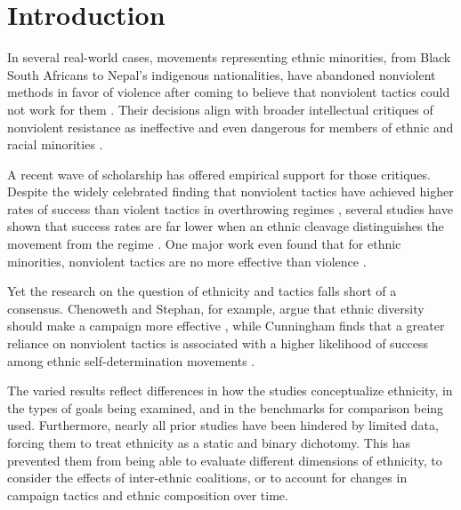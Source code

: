 \documentclass[
  letterpaper,
  DIV=11,
  numbers=noendperiod]{scrartcl}
\begin{document}
\newpage

\section{Introduction}\label{introduction}

In several real-world cases, movements representing ethnic minorities,
from Black South Africans to Nepal's indigenous nationalities, have
abandoned nonviolent methods in favor of violence after coming to
believe that nonviolent tactics could not work for them
\autocite{Thurber2021}. Their decisions align with broader intellectual
critiques of nonviolent resistance as ineffective and even dangerous for
members of ethnic and racial minorities
\autocite{Gelderloos2007,CobbJr.2015,Jackson2020}.

A recent wave of scholarship has offered empirical support for those
critiques. Despite the widely celebrated finding that nonviolent tactics
have achieved higher rates of success than violent tactics in
overthrowing regimes \autocite{Chenoweth2011,Gleditsch2022}, several
studies have shown that success rates are far lower when an ethnic
cleavage distinguishes the movement from the regime
\autocite{Svensson2011,Pischedda2020}. One major work even found that
for ethnic minorities, nonviolent tactics are no more effective than
violence \autocite[161]{Manekin2022}.

Yet the research on the question of ethnicity and tactics falls short of
a consensus. Chenoweth and Stephan, for example, argue that ethnic
diversity should make a campaign more effective
\autocite{Chenoweth2011}, while Cunningham finds that a greater reliance
on nonviolent tactics is associated with a higher likelihood of success
among ethnic self-determination movements \autocite{Cunningham2023}.

The varied results reflect differences in how the studies conceptualize
ethnicity, in the types of goals being examined, and in the benchmarks
for comparison being used. Furthermore, nearly all prior studies have
been hindered by limited data, forcing them to treat ethnicity as a
static and binary dichotomy. This has prevented them from being able to
evaluate different dimensions of ethnicity, to consider the effects of
inter-ethnic coalitions, or to account for changes in campaign tactics
and ethnic composition over time.
\end{document}
